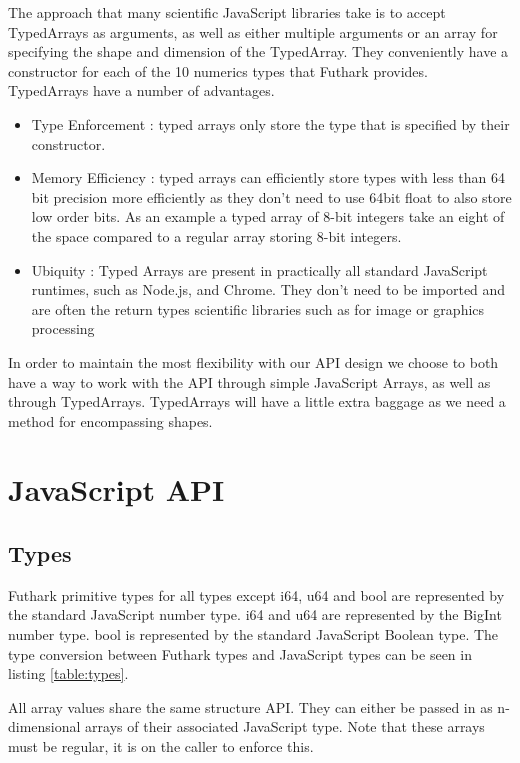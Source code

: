\documentclass[11pt]{book}
\begin{document}
The approach that many scientific JavaScript libraries take is to accept TypedArrays as arguments, as well as either multiple arguments or an array for specifying the shape and dimension of the TypedArray. They conveniently have a constructor for each of the 10 numerics types that Futhark provides. TypedArrays have a number of advantages.

\begin{itemize}
    \item Type Enforcement : typed arrays only store the type that is specified by their constructor. 
    \item Memory Efficiency : typed arrays can efficiently store types with less than 64 bit precision more efficiently as they don't need to use 64bit float to also store low order bits. As an example a typed array of 8-bit integers take an eight of the space compared to a regular array storing 8-bit integers.
    \item Ubiquity : Typed Arrays are present in practically all standard JavaScript runtimes, such as Node.js, and Chrome. They don't need to be imported and are often the return types scientific libraries such as for image or graphics processing
\end{itemize}


In order to maintain the most flexibility with our API design we choose to both have a way to work with the API through simple JavaScript Arrays, as well as through TypedArrays. TypedArrays will have a little extra baggage as we need a method for encompassing shapes.


\section{JavaScript API}

\subsection{Types}

Futhark primitive types for all types except i64, u64 and bool are represented by the standard JavaScript number type. i64 and u64 are represented by the BigInt number type. bool is represented by the standard JavaScript Boolean type. The type conversion between Futhark types and JavaScript types can be seen in listing \ref{table:types}.

All array values share the same structure API. They can either be passed in as n-dimensional arrays of their associated JavaScript type. Note that these arrays must be regular, it is on the caller to enforce this.
\end{document}
